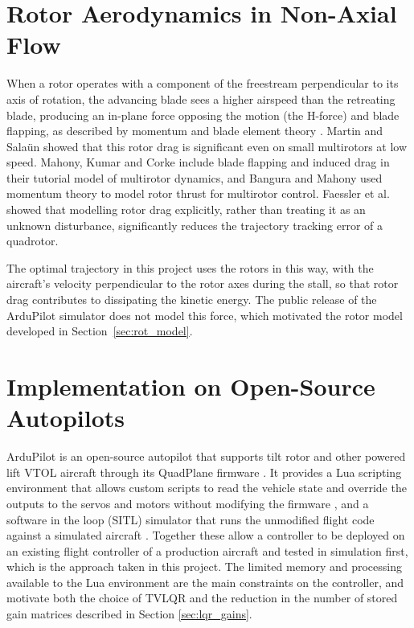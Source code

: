 \section{Rotor Aerodynamics in Non-Axial Flow}
\label{sec:lit_rotor}

When a rotor operates with a component of the freestream perpendicular to its axis of rotation, the advancing blade sees a higher airspeed than the retreating blade, producing an in-plane force opposing the motion (the H-force) and blade flapping, as described by momentum and blade element theory \cite{leishman2006principles}. Martin and Salaün \cite{martin2010true} showed that this rotor drag is significant even on small multirotors at low speed. Mahony, Kumar and Corke \cite{mahony2012multirotor} include blade flapping and induced drag in their tutorial model of multirotor dynamics, and Bangura and Mahony \cite{bangura2017thrust} used momentum theory to model rotor thrust for multirotor control. Faessler et al. \cite{faessler2018differential} showed that modelling rotor drag explicitly, rather than treating it as an unknown disturbance, significantly reduces the trajectory tracking error of a quadrotor.

The optimal trajectory in this project uses the rotors in this way, with the aircraft's velocity perpendicular to the rotor axes during the stall, so that rotor drag contributes to dissipating the kinetic energy. The public release of the ArduPilot simulator does not model this force, which motivated the rotor model developed in Section~\ref{sec:rot_model}.

\section{Implementation on Open-Source Autopilots}
\label{sec:lit_ardupilot}

ArduPilot is an open-source autopilot that supports tilt rotor and other powered lift VTOL aircraft through its QuadPlane firmware \cite{ardupilot_quadplane}. It provides a Lua scripting environment that allows custom scripts to read the vehicle state and override the outputs to the servos and motors without modifying the firmware \cite{ardupilot_lua}, and a software in the loop (SITL) simulator that runs the unmodified flight code against a simulated aircraft \cite{ardupilot_sitl}. Together these allow a controller to be deployed on an existing flight controller of a production aircraft and tested in simulation first, which is the approach taken in this project. The limited memory and processing available to the Lua environment are the main constraints on the controller, and motivate both the choice of TVLQR and the reduction in the number of stored gain matrices described in Section \ref{sec:lqr_gains}.

